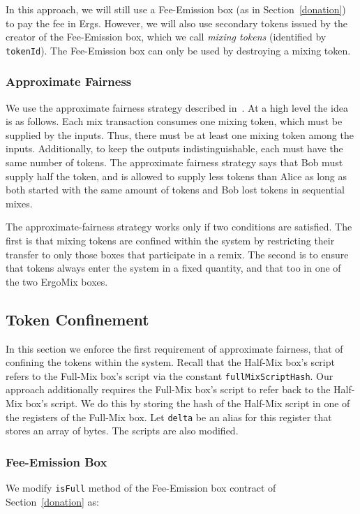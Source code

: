 \documentclass[runningheads]{llncs}
\newcommand{\mixname}{ErgoMix\xspace}
\begin{document}
In this approach, we will still use a Fee-Emission box (as in Section~\ref{donation}) to pay the fee in Ergs. However, we will also use secondary tokens issued by the creator of the Fee-Emission box, which we call {\em mixing tokens} (identified by \texttt{tokenId}). The Fee-Emission box can only be used by destroying a mixing token.

\subsubsection{Approximate Fairness}

We use the approximate fairness strategy described in~\cite{advtutorial}. At a high level the idea is as follows.
Each mix transaction consumes one mixing token, which must be supplied by the inputs. Thus, there must be at least one mixing token among the inputs. Additionally, to keep the outputs indistinguishable, each must have the same number of tokens. The approximate fairness strategy says that Bob must supply half the token, and is allowed to supply less tokens than Alice as long as both started with the same amount of tokens and Bob lost tokens in sequential mixes.

The approximate-fairness strategy works only if two conditions are satisfied. The first is that mixing tokens are confined within the system by restricting their transfer to only those boxes that participate in a remix. 
The second is to ensure that tokens always enter the system in a fixed quantity, and that too in one of the two \mixname boxes. 

\subsection{Token Confinement}

In this section we enforce the first requirement of approximate fairness, that of confining the tokens within the system. 
Recall that the Half-Mix box's script refers to the Full-Mix box's script via the constant \texttt{fullMixScriptHash}. Our approach additionally requires the Full-Mix box's script to refer back to the Half-Mix box's script. We do this by storing the hash of the Half-Mix script in one of the registers of the Full-Mix box. Let \texttt{delta} be an alias for this register that stores an array of bytes. The scripts are also modified.

\subsubsection{Fee-Emission Box}
We modify \texttt{isFull} method of the Fee-Emission box contract of Section~\ref{donation} as:
\end{document}
